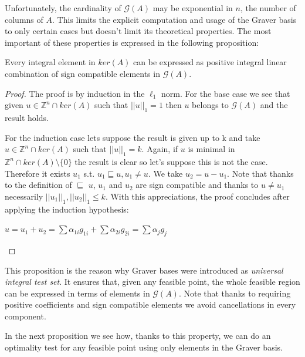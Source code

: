 Unfortunately, the cardinality of $\mathcal{G}(A)$ may be exponential in $n$, the number of columns of $A$. This limits the explicit computation and usage of the Graver basis to only certain cases but doesn't limit its theoretical properties. The most important of these properties is expressed in the following proposition:

\begin{proposition}\label{GB_test_set}
Every integral element in $ker(A)$ can be expressed as positive integral linear combination of sign compatible elements in $\mathcal{G}(A)$.
\end{proposition}
\vspace{-20pt}
\begin{proof}
The proof is by induction in the $\ell_1$ norm. For the base case we see that given $u \in \mathbb{Z}^n\cap ker(A)$ such that $||u||_1 = 1$ then $u$ belongs to $\mathcal{G}(A)$ and the result holds.

For the induction case lets suppose the result is given up to k and take $u \in \mathbb{Z}^n\cap ker(A)$ such that $||u||_1 = k$. Again, if $u$ is minimal in $\mathbb{Z}^n\cap ker(A) \setminus \{0\}$ the result is clear so let's suppose this is not the case. Therefore it exists $u_1$ s.t. $u_1 \sqsubseteq u, u_1 \neq u$. We take $u_2 = u - u_1$. Note that thanks to the definition of $\sqsubseteq$ $u$, $u_1$ and $u_2$ are sign compatible and thanks to $u \neq u_1$ necessarily  $||u_1||_1,||u_2||_1 \leq k$. With this appreciations, the proof concludes after applying the induction hypothesis:\\
\vspace{-30pt}
\begin{center}
    $u = u_1 + u_2 = \sum \alpha_{1i}g_{1i} + \sum \alpha_{2i}g_{2i} = \sum \alpha_{j}g_{j}$
\end{center}
\end{proof}

This proposition is the reason why Graver bases were introduced as \textit{universal integral test set}. It ensures that, given any feasible point, the whole feasible region can be expressed in terms of elements in $\mathcal{G}(A)$. Note that thanks to requiring positive coefficients and sign compatible elements we avoid cancellations in every component. 

In the next proposition we see how, thanks to this property, we can do an optimality test for any feasible point using only elements in the Graver basis.

